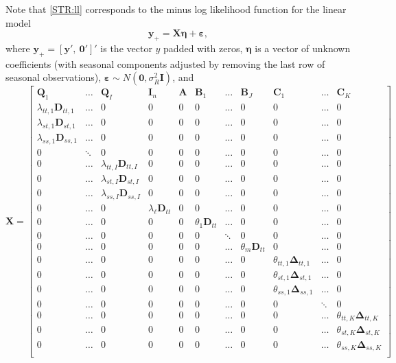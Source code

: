 \documentclass[ijds,nonblindrev]{informs-ijds}
\begin{document}
Note that \eqref{STR:ll} corresponds to the minus log likelihood function for the linear model
\begin{equation}
  \label{STR:linear_model}
  \bm{y}_{+} = \bm{X}\bm{\eta} + \bm{\varepsilon} ,
\end{equation}
where \(\bm{y}_{+} = [\bm{y}',~ \bm{0}']'\) is the vector \(y\) padded with zeros,
\(\bm{\eta}\) is a vector of unknown coefficients (with seasonal components adjusted by removing the last row of seasonal observations),
\(\bm{\varepsilon} \sim N(\bm{0},\sigma_R^2\bm{I})\),
and
\begin{equation}
  \label{regr:X}
  \bm{X} =
  \begin{bmatrix}
 \bm{Q}_1 & \dots & \bm{Q}_I & \bm{I}_n & \bm{A} & \bm{B}_1 & \dots & \bm{B}_J & \bm{C}_1 & \dots & \bm{C}_K \\
 \lambda_{tt,1} \bm{D}_{tt,1} & \dots & 0 & 0 & 0 & 0 & \dots & 0 & 0 & \dots & 0 \\
 \lambda_{st,1} \bm{D}_{st,1} & \dots & 0 & 0 & 0 & 0 & \dots & 0 & 0 & \dots & 0 \\
 \lambda_{ss,1} \bm{D}_{ss,1} & \dots & 0 & 0 & 0 & 0 & \dots & 0 & 0 & \dots & 0 \\
 0 & \ddots & 0 & 0 & 0 & 0 & \dots & 0 & 0 & \dots & 0 \\
 0 & \dots & \lambda_{tt,I} \bm{D}_{tt,I} & 0 & 0 & 0 & \dots & 0 & 0 & \dots & 0\\
 0 & \dots & \lambda_{st,I} \bm{D}_{st,I} & 0 & 0 & 0 & \dots & 0 & 0 & \dots & 0 \\
 0 & \dots & \lambda_{ss,I} \bm{D}_{ss,I} & 0 & 0 & 0 & \dots & 0 & 0 & \dots & 0 \\
 0 & \dots & 0 & \lambda_\ell \bm{D}_{tt} & 0 & 0 & \dots & 0 & 0 & \dots & 0 \\
 0 & \dots & 0 & 0 & 0 & \theta_1 \bm{D}_{tt} & \dots & 0 & 0 & \dots & 0 \\
 0 & \dots & 0 & 0 & 0 & 0 & \ddots & 0 & 0 & \dots & 0 \\
 0 & \dots & 0 & 0 & 0 & 0 & \dots & \theta_m \bm{D}_{tt} & 0 & \dots & 0 \\
 0 & \dots & 0 & 0 & 0 & 0 & \dots & 0 & \theta_{tt,1} \bm{\Delta}_{tt,1} & \dots & 0 \\
 0 & \dots & 0 & 0 & 0 & 0 & \dots & 0 & \theta_{st,1} \bm{\Delta}_{st,1} & \dots & 0 \\
 0 & \dots & 0 & 0 & 0 & 0 & \dots & 0 & \theta_{ss,1} \bm{\Delta}_{ss,1} & \dots & 0 \\
 0 & \dots & 0 & 0 & 0 & 0 & \dots & 0 & 0 & \ddots & 0 \\
 0 & \dots & 0 & 0 & 0 & 0 & \dots & 0 & 0 & \dots & \theta_{tt,K} \bm{\Delta}_{tt,K} \\
 0 & \dots & 0 & 0 & 0 & 0 & \dots & 0 & 0 & \dots & \theta_{st,K} \bm{\Delta}_{st,K} \\
 0 & \dots & 0 & 0 & 0 & 0 & \dots & 0 & 0 & \dots & \theta_{ss,K} \bm{\Delta}_{ss,K} \\
  \end{bmatrix}
\end{equation}
\end{document}

